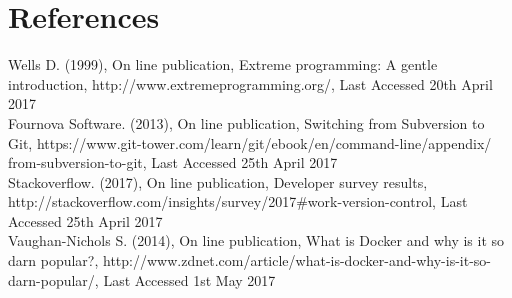 %
%
%
%
%
%

\section*{References}
\label{sec:references}

\begin{thebibliography}{0}


Wells D. (1999), On line publication, Extreme programming: A gentle introduction, http://www.extremeprogramming.org/, Last Accessed 20th April 2017
\\
Fournova Software. (2013), On line publication, Switching from Subversion to Git, https://www.git-tower.com/learn/git/ebook/en/command-line/appendix/\\from-subversion-to-git, Last Accessed 25th April 2017
\\
Stackoverflow. (2017), On line publication, Developer survey results, http://stackoverflow.com/insights/survey/2017\#work-version-control, Last Accessed 25th April 2017
\\
Vaughan-Nichols S. (2014), On line publication, What is Docker and why is it so darn popular?, http://www.zdnet.com/article/what-is-docker-and-why-is-it-so-darn-popular/, Last Accessed 1st May 2017

\end{thebibliography}